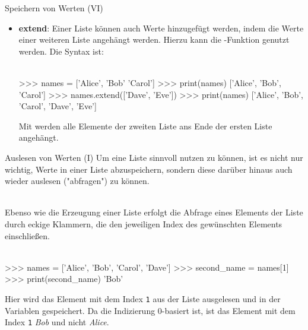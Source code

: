         \begin{frame}[fragile]{Speichern von Werten (VI)}
            \begin{itemize}
                \item \textbf{extend}: Einer Liste können auch Werte hinzugefügt werden, indem die Werte einer weiteren Liste angehängt werden. Hierzu kann die -Funktion genutzt werden. Die Syntax ist: \\~\
                
                
\begin{pyconcode}
>>> names = ['Alice', 'Bob' 'Carol']
>>> print(names)
['Alice', 'Bob', 'Carol']
>>> names.extend(['Dave', 'Eve'])
>>> print(names)
['Alice', 'Bob', 'Carol', 'Dave', 'Eve']
\end{pyconcode} 

            
            Mit  werden alle Elemente der zweiten Liste ans Ende der ersten Liste angehängt.
            \end{itemize}
        \end{frame}
        
        
        \begin{frame}[fragile]{Auslesen von Werten (I)}
            Um eine Liste sinnvoll nutzen zu können, ist es nicht nur wichtig, Werte in einer Liste abzuspeichern, sondern diese darüber hinaus auch wieder auslesen ("abfragen") zu können. \\~\
            
            Ebenso wie die Erzeugung einer Liste erfolgt die Abfrage eines Elements der Liste durch eckige Klammern, die den jeweiligen Index des gewünschten Elements einschließen. \\~\

\begin{pyconcode}
>>> names = ['Alice', 'Bob', 'Carol', 'Dave']
>>> second_name = names[1]
>>> print(second_name)
'Bob'
\end{pyconcode}             
        
            Hier wird das Element mit dem Index \texttt{1} aus der Liste  ausgelesen und in der Variablen  gespeichert. Da die Indizierung 0-basiert ist, ist das Element mit dem Index \texttt{1} \textit{Bob} und nicht \textit{Alice}.
        \end{frame}
        
